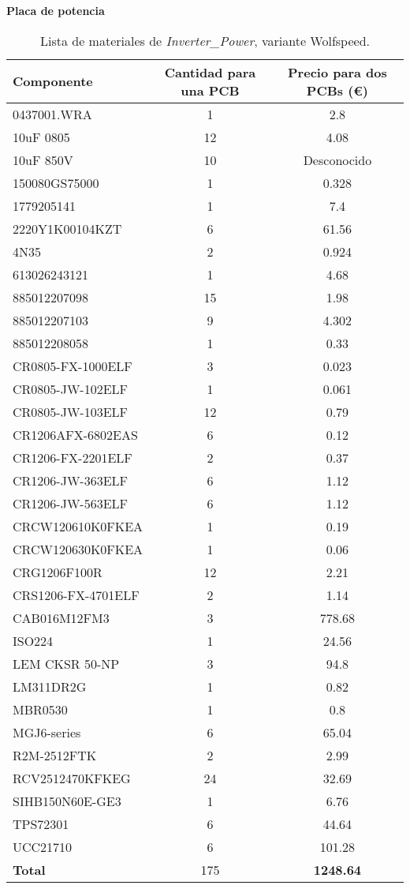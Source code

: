 \textbf{Placa de potencia}
\begin{table}[H]
	\centering
	\begin{tabular}{|l|c|c|}
		\hline
		\textbf{Componente} & \textbf{Cantidad para una PCB} & \textbf{Precio para dos PCBs (\euro{})} \\
		\hline
		0437001.WRA & 1 & 2.8 \\
		10uF 0805 & 12 & 4.08 \\
		10uF 850V & 10 & Desconocido \\
		150080GS75000 & 1 & 0.328 \\
		1779205141 & 1 & 7.4 \\
		2220Y1K00104KZT & 6 & 61.56 \\
		4N35 & 2 & 0.924 \\
		613026243121 & 1 & 4.68 \\
		885012207098 & 15 & 1.98 \\
		885012207103 & 9 & 4.302 \\
		885012208058 & 1 & 0.33 \\
		CR0805-FX-1000ELF & 3 & 0.023 \\
		CR0805-JW-102ELF & 1 & 0.061 \\
		CR0805-JW-103ELF & 12 & 0.79 \\
		CR1206AFX-6802EAS & 6 & 0.12 \\
		CR1206-FX-2201ELF & 2 & 0.37 \\
		CR1206-JW-363ELF & 6 & 1.12 \\
		CR1206-JW-563ELF & 6 & 1.12 \\
		CRCW120610K0FKEA & 1 & 0.19 \\
		CRCW120630K0FKEA & 1 & 0.06 \\
		CRG1206F100R & 12 & 2.21 \\
		CRS1206-FX-4701ELF & 2 & 1.14 \\
		CAB016M12FM3 & 3 & 778.68 \\
		ISO224 & 1 & 24.56 \\
		LEM CKSR 50-NP & 3 & 94.8 \\
		LM311DR2G & 1 & 0.82 \\
		MBR0530 & 1 & 0.8 \\
		MGJ6-series & 6 & 65.04 \\
		R2M-2512FTK & 2 & 2.99 \\
		RCV2512470KFKEG & 24 & 32.69 \\
		SIHB150N60E-GE3 & 1 & 6.76 \\
		TPS72301 & 6 & 44.64 \\
		UCC21710 & 6 & 101.28 \\
		\hline
		\textbf{Total} & 175 & \textbf{1248.64} \\
		\hline
	\end{tabular}
	\caption{Lista de materiales de \textit{Inverter\_Power}, variante Wolfspeed.}
\end{table}

